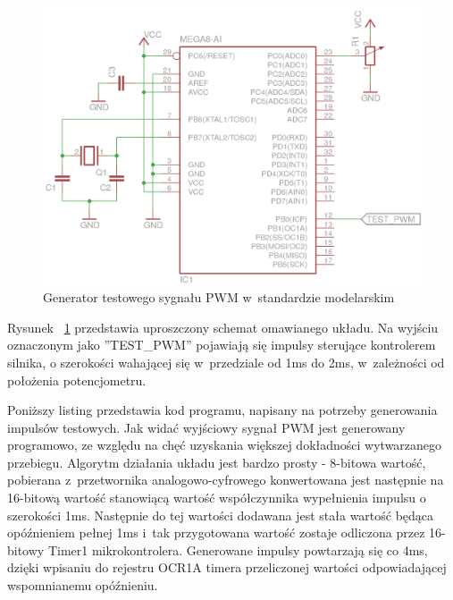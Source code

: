 \begin{figure}[H]
	\centering
	\includegraphics[scale=1]{Pictures/TestSignalGenerator.png}
	\caption[Generator testowego sygnału PWM w~standardzie modelarskim]{Generator testowego sygnału PWM w~standardzie modelarskim}
	\label{fig:TestSignalGenerator_sch}
\end{figure}

Rysunek ~\ref{fig:TestSignalGenerator_sch} przedstawia uproszczony schemat omawianego układu. Na wyjściu oznaczonym jako ''TEST\_PWM'' pojawiają się impulsy sterujące kontrolerem silnika, o szerokości wahającej się w~przedziale od 1ms do 2ms, w~zależności od położenia potencjometru.

Poniższy listing przedstawia kod programu, napisany na potrzeby generowania impulsów testowych. Jak widać wyjściowy sygnał PWM jest generowany programowo, ze względu na chęć uzyskania większej dokładności wytwarzanego przebiegu. Algorytm działania układu jest bardzo prosty - 8-bitowa wartość, pobierana z~przetwornika analogowo-cyfrowego konwertowana jest następnie na 16-bitową wartość stanowiącą wartość współczynnika wypełnienia impulsu o szerokości 1ms. Następnie do tej wartości dodawana jest stała wartość będąca opóźnieniem pełnej 1ms i~tak przygotowana wartość zostaje odliczona przez 16-bitowy Timer1 mikrokontrolera. Generowane impulsy powtarzają się co 4ms, dzięki wpisaniu do rejestru OCR1A timera przeliczonej wartości odpowiadającej wspomnianemu opóźnieniu.

